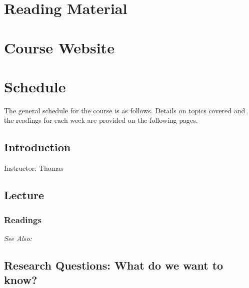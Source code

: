 \documentclass[12pt,a4paper]{article}
\newcommand{\thomas}{\vspace{1em}\noindent Instructor: Thomas\\}
\newcommand{\seealso}{\noindent \emph{See Also:}}
\begin{document}



\clearpage
\section{Reading Material}

\section{Course Website}




\clearpage
\section{Schedule}
The general schedule for the course is as follows. Details on topics covered and the readings for each week are provided on the following pages.

\secttoc

\clearpage


\subsection{Introduction}
\emph{}

\thomas

\subsection*{Lecture}

\begin{itemize*}
\item 
\end{itemize*}

\subsubsection*{Readings}

\seealso

\subsection{Research Questions: What do we want to know?}
\end{document}
